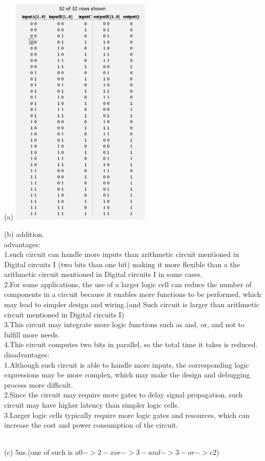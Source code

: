 \documentclass[a4paper]{article}
\begin{document}
\begin{answer}[Question 1]
    \item[(a)]
    \includegraphics[width=0.5\textwidth]{hw4_q1_1.png}
    \\
    \item[(b)]
    addition.\\
    advantages:\\
    1.such circuit can handle more inputs than arithmetic circuit mentioned in Digital circuits I (two bits than one bit) making it more flexible than a the arithmetic circuit mentioned in Digital circuits I in some cases.\\
    2.For some applications, the use of a larger logic cell can reduce the number of components in a circuit because it enables more functions to be performed, which may lead to simpler design and wiring.(and Such circuit is larger than arithmetic circuit mentioned in Digital circuits I)\\
    3.This circuit may integrate more logic functions such as and, or, and not to fulfill more needs.\\
    4.This circuit computes two bits in parallel, so the total time it takes is reduced.\\

    disadvantages:\\
    1.Although such circuit is able to handle more inputs, the corresponding logic expressions may be more complex, which may make the design and debugging process more difficult.\\
    2.Since the circuit may require more gates to delay signal propagation, such circuit may have higher latency than simpler logic cells.\\
    3.Larger logic cells typically require more logic gates and resources, which can increase the cost and power consumption of the circuit.\\
    \\
    \item[(c)]
    5ns.(one of such is $a0->2-xor->3-and->3-or->c2$)\\
\end{answer}
\end{document}
